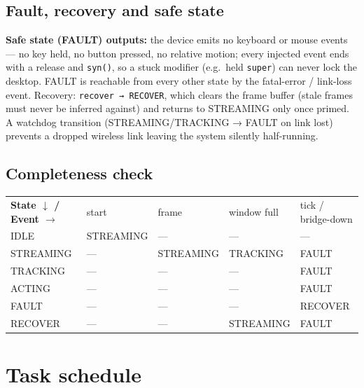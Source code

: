 \documentclass[11pt,a4paper]{article}
\newcommand{\hdrow}[1]{\rowcolor{headbg}\color{headfg}\bfseries #1}
\begin{document}
\subsection{Fault, recovery and safe state}
\textbf{Safe state (FAULT) outputs:} the device emits no keyboard or mouse
events — no key held, no button pressed, no relative motion; every injected event
ends with a release and \texttt{syn()}, so a stuck modifier (e.g.\ held
\texttt{super}) can never lock the desktop. FAULT is reachable from every other
state by the fatal-error / link-loss event. Recovery: \texttt{recover →
RECOVER}, which clears the frame buffer (stale frames must never be inferred
against) and returns to STREAMING only once primed. A watchdog transition
(STREAMING/TRACKING → FAULT on link lost) prevents a dropped wireless link
leaving the system silently half-running.

\subsection{Completeness check}
\begin{tabularx}{\textwidth}{@{}p{2.0cm}XXXX@{}}
\hdrow{State $\downarrow$ / Event $\rightarrow$ & start & frame & window full & tick / bridge-down} \\[1pt]
IDLE & STREAMING & --- & --- & --- \\
STREAMING & --- & STREAMING & TRACKING & FAULT \\
TRACKING & --- & --- & --- & FAULT \\
ACTING & --- & --- & --- & FAULT \\
FAULT & --- & --- & --- & RECOVER \\
RECOVER & --- & --- & STREAMING & FAULT \\
\end{tabularx}

\section{Task schedule}
\end{document}
